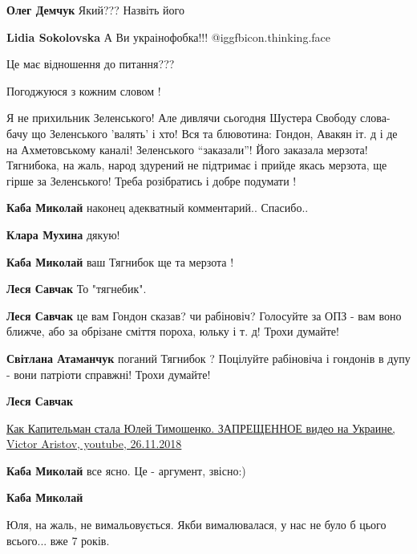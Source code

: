 \begin{itemize}
\begin{itemize}
\textbf{Олег Демчук} Який??? Назвіть його

\textbf{Lidia Sokolovska} А Ви украінофобка!!! @igg{fbicon.thinking.face} 

Це має відношення до питання???

\end{itemize} %

Погоджуюся з кожним словом !


Я не прихильник Зеленського! Але дивлячи сьогодня Шустера Свободу слова- бачу
що Зеленського 'валять' і хто! Вся та блювотина: Гондон, Авакян іт. д і де на
Ахметовському каналі! Зеленського \enquote{заказали}! Його заказала мерзота!
Тягнибока, на жаль, народ здурений не підтримає і прийде якась мерзота, ще
гірше за Зеленського! Треба розібратись і добре подумати !

\begin{itemize} %
\textbf{Каба Миколай} наконец адекватный комментарий.. Спасибо..

\textbf{Клара Мухина} дякую!

\textbf{Каба Миколай} ваш Тягнибок ще та мерзота !

\begin{itemize} %
\textbf{Леся Савчак} То "тягнебик".

\textbf{Леся Савчак} це вам Гондон сказав? чи рабіновіч? Голосуйте за ОПЗ - вам воно ближче, або за обрізане сміття пороха, юльку і т. д! Трохи думайте!

\textbf{Світлана Атаманчук} поганий Тягнибок ? Поцілуйте рабіновіча і гондонів в дупу - вони патріоти справжні! Трохи думайте!

\textbf{Леся Савчак} 

\href{https://youtu.be/SpzEzzarmlchttps://youtu.be/SpzEzzarmlc}{%
Как Капительман стала Юлей Тимошенко. ЗАПРЕЩЕННОЕ видео на Украине, %
Victor Aristov, youtube, 26.11.2018%
}

\textbf{Каба Миколай} все ясно. Це - аргумент, звісно:)

\end{itemize} %

\textbf{Каба Миколай} 

Юля, на жаль, не вимальовується. Якби вималювалася, у нас не було б цього
всього... вже 7 років.


\end{itemize}
\end{itemize}
